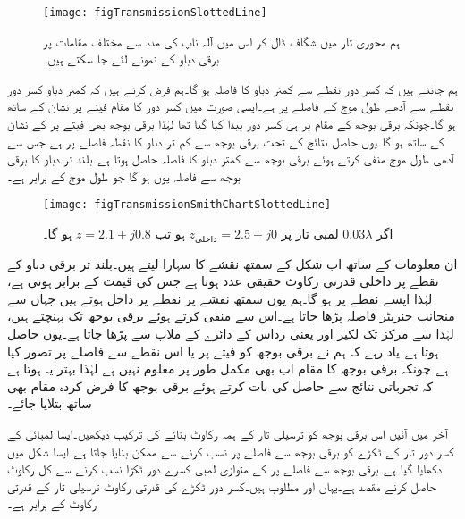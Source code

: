 \begin{figure}
\centering
\texttt{[image: figTransmissionSlottedLine]}
\caption{ہم محوری تار میں شگاف ڈال کر اس میں آلہ ناپ کی مدد سے مختلف مقامات پر برقی دباو  کے نمونے لئے جا سکتے ہیں۔}
\label{شکل_ترسیلی_ہم_محوری_شگاف_دار}
\end{figure}
ہم جانتے ہیں کہ کسر دور نقطے سے کمتر دباو کا فاصلہ  ہو گا۔ہم فرض کرتے ہیں کہ کمتر دباو کسر دور نقطے سے آدھے طول موج کے فاصلے پر ہے۔ایسی صورت میں کسر دور کا مقام فیتے پر  نشان کے ساتھ ہو گا۔چونکہ برقی بوجھ کے مقام پر ہی کسر دور پیدا کیا گیا تھا لہٰذا برقی بوجھ بھی فیتے پر  کے نشان کے ساتھ ہو گا۔یوں حاصل نتائج کے تحت برقی بوجھ سے کم تر دباو کا نقطہ  فاصلے پر ہے جس سے آدھی طول موج منفی کرتے ہوئے برقی بوجھ سے کمتر دباو کا فاصلہ  حاصل ہوتا ہے۔بلند تر دباو کا برقی بوجھ سے فاصلہ یوں
  ہو گا جو  طول موج کے برابر ہے۔
\begin{figure}
\centering
\texttt{[image: figTransmissionSmithChartSlottedLine]}
\caption{اگر $0.03\lambda$ لمبی تار پر $z_{\text{داخلی}}=2.5+j0$ ہو تب $z=2.1+j0.8$ ہو گا۔}
\label{شکل_ترسیلی_ہم_محوری_تجرباتی_نتائج}
\end{figure}

ان معلومات کے ساتھ اب شکل  کے سمتھ نقشے کا سہارا لیتے ہیں۔بلند تر برقی دباو کے نقطے پر  داخلی قدرتی رکاوٹ حقیقی عدد ہوتا ہے جس کی قیمت  کے برابر ہوتی ہے، لہٰذا ایسے نقطے پر  ہو گا۔ہم یوں سمتھ نقشے پر  نقطے پر داخل ہوتے ہیں جہاں سے منجانب جنریٹر فاصلہ  پڑھا جاتا ہے۔اس سے  منفی کرتے ہوئے  برقی بوجھ تک پہنچتے ہیں، لہٰذا  سے مرکز تک لکیر اور  یعنی      رداس کے دائرے کے ملاپ سے  پڑھا جاتا ہے۔یوں  حاصل ہوتا ہے۔یاد رہے کہ ہم نے برقی بوجھ کو فیتے پر  یا اس نقطے سے  فاصلے پر تصور کیا ہے۔چونکہ برقی بوجھ کا مقام اب بھی مکمل طور پر معلوم نہیں ہے لہٰذا بہتر یہ ہوتا ہے کہ تجرباتی نتائج سے حاصل  کی بات کرتے ہوئے برقی بوجھ کا فرض کردہ مقام بھی ساتھ بتلایا جائے۔

آخر میں آئیں اس برقی بوجھ کو  ترسیلی تار کے ہمہ رکاوٹ بنانے کی ترکیب دیکھیں۔ایسا  لمبائی کے کسر دور تار کے ٹکڑے کو برقی بوجھ سے  فاصلے پر نسب کرنے سے ممکن بنایا جاتا ہے۔ایسا شکل  میں دکھایا گیا ہے۔برقی بوجھ سے  فاصلے پر  کے متوازی  لمبی کسرے دور ٹکڑا نسب کرنے سے کل رکاوٹ  حاصل کرنے مقصد ہے۔یہاں  اور  مطلوب ہیں۔کسر دور ٹکڑے کی قدرتی رکاوٹ ترسیلی تار کے قدرتی رکاوٹ  کے برابر ہے۔ 

